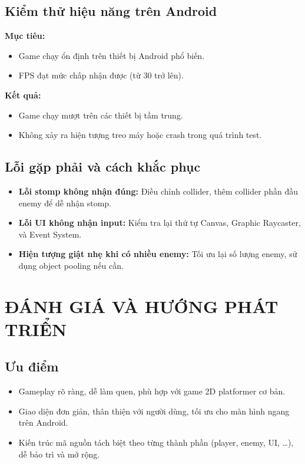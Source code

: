 \documentclass[a4paper,12pt]{article}
\begin{document}
\subsection{Kiểm thử hiệu năng trên Android}

\textbf{Mục tiêu:}
\begin{itemize}
    \item Game chạy ổn định trên thiết bị Android phổ biến.
    \item FPS đạt mức chấp nhận được (từ 30 trở lên).
\end{itemize}

\textbf{Kết quả:}
\begin{itemize}
    \item Game chạy mượt trên các thiết bị tầm trung.
    \item Không xảy ra hiện tượng treo máy hoặc crash trong quá trình test.
\end{itemize}

\subsection{Lỗi gặp phải và cách khắc phục}

\begin{itemize}
    \item \textbf{Lỗi stomp không nhận đúng:} Điều chỉnh collider, thêm collider phần đầu enemy để dễ nhận stomp.
    \item \textbf{Lỗi UI không nhận input:} Kiểm tra lại thứ tự Canvas, Graphic Raycaster, và Event System.
    \item \textbf{Hiện tượng giật nhẹ khi có nhiều enemy:} Tối ưu lại số lượng enemy, sử dụng object pooling nếu cần.
\end{itemize}

\newpage

\section{ĐÁNH GIÁ VÀ HƯỚNG PHÁT TRIỂN}

\subsection{Ưu điểm}

\begin{itemize}
    \item Gameplay rõ ràng, dễ làm quen, phù hợp với game 2D platformer cơ bản.
    \item Giao diện đơn giản, thân thiện với người dùng, tối ưu cho màn hình ngang trên Android.
    \item Kiến trúc mã nguồn tách biệt theo từng thành phần (player, enemy, UI, \ldots), dễ bảo trì và mở rộng.
\end{itemize}
\end{document}
